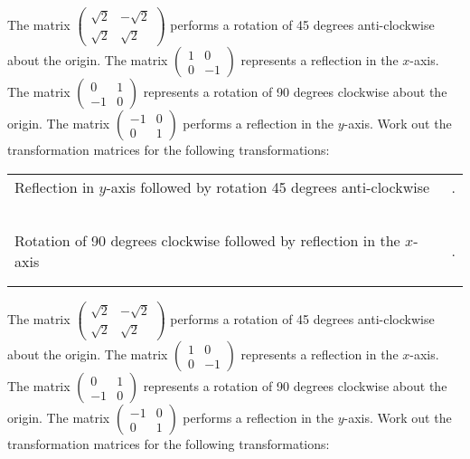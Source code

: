\documentclass[fontsize=20pt]{scrartcl}
\begin{document}
The matrix $\begin{pmatrix}\sqrt{2}&-\sqrt{2}\\ \sqrt{2}&\sqrt{2}\end{pmatrix}$ performs a rotation of 45 degrees anti-clockwise about the origin. The matrix $\begin{pmatrix}1 &0\\0&-1\end{pmatrix}$ represents a reflection in the $x$-axis. The matrix $\begin{pmatrix}0&1\\-1&0\end{pmatrix}$ represents a rotation of 90 degrees clockwise about the origin. The matrix $\begin{pmatrix}-1&0\\0&1\end{pmatrix}$ performs a reflection in the $y$-axis. Work out the transformation matrices for the following transformations:
\newline
\newline
\begin{tabular}{p{13cm}p{13cm}}
Reflection in $y$-axis followed by rotation 45 degrees anti-clockwise
&.
\\\\\\\\\\\\
Rotation of 90 degrees clockwise followed by reflection in the $x$-axis
&.
\\\\\\\end{tabular}
\newpage
The matrix $\begin{pmatrix}\sqrt{2}&-\sqrt{2}\\ \sqrt{2}&\sqrt{2}\end{pmatrix}$ performs a rotation of 45 degrees anti-clockwise about the origin. The matrix $\begin{pmatrix}1 &0\\0&-1\end{pmatrix}$ represents a reflection in the $x$-axis. The matrix $\begin{pmatrix}0&1\\-1&0\end{pmatrix}$ represents a rotation of 90 degrees clockwise about the origin. The matrix $\begin{pmatrix}-1&0\\0&1\end{pmatrix}$ performs a reflection in the $y$-axis. Work out the transformation matrices for the following transformations:
\end{document}
